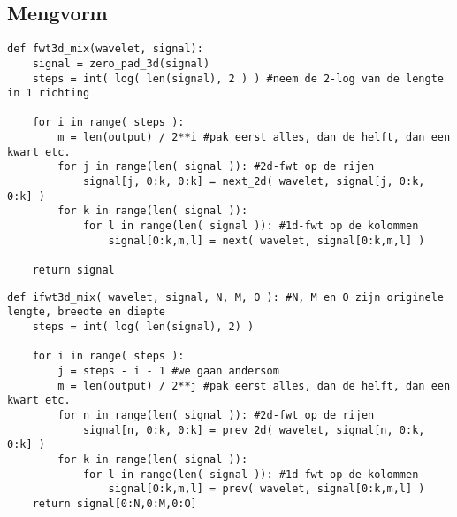 \subsection{Mengvorm}
\begin{lstlisting}[caption=De mengvorm in 3 dimensies]
def fwt3d_mix(wavelet, signal):
	signal = zero_pad_3d(signal)
	steps = int( log( len(signal), 2 ) ) #neem de 2-log van de lengte in 1 richting
	
	for i in range( steps ):
		m = len(output) / 2**i #pak eerst alles, dan de helft, dan een kwart etc.
		for j in range(len( signal )): #2d-fwt op de rijen
			signal[j, 0:k, 0:k] = next_2d( wavelet, signal[j, 0:k, 0:k] )
		for k in range(len( signal )):
			for l in range(len( signal )): #1d-fwt op de kolommen
				signal[0:k,m,l] = next( wavelet, signal[0:k,m,l] )

	return signal
\end{lstlisting}
\begin{lstlisting}[caption=De omgekeerde mengvorm in 3 dimensies]
def ifwt3d_mix( wavelet, signal, N, M, O ): #N, M en O zijn originele lengte, breedte en diepte
	steps = int( log( len(signal), 2) )
	
	for i in range( steps ):
		j = steps - i - 1 #we gaan andersom
		m = len(output) / 2**j #pak eerst alles, dan de helft, dan een kwart etc.
		for n in range(len( signal )): #2d-fwt op de rijen
			signal[n, 0:k, 0:k] = prev_2d( wavelet, signal[n, 0:k, 0:k] )
		for k in range(len( signal )):
			for l in range(len( signal )): #1d-fwt op de kolommen
				signal[0:k,m,l] = prev( wavelet, signal[0:k,m,l] )
	return signal[0:N,0:M,0:O]
\end{lstlisting}
